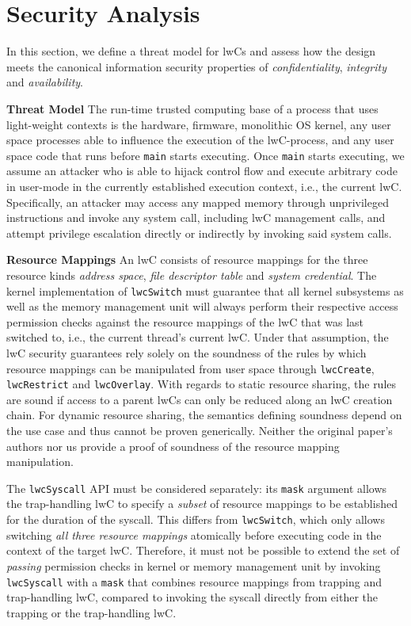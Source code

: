 \documentclass[10pt,twocolumn,a4paper]{article}
\begin{document}
\section{Security Analysis}\label{security}

In this section, we define a threat model for lwCs and assess how the design meets the canonical information security properties of \textit{confidentiality}, \textit{integrity} and \textit{availability}\cite{ciagoals}.

\textbf{Threat Model}\hspace{1em}
The run-time trusted computing base of a process that uses light-weight contexts is the
hardware,
firmware,
monolithic OS kernel,
any user space processes able to influence the execution of the lwC-process,
and any user space code that runs before \lstinline{main} starts executing.
Once \lstinline{main} starts executing, we assume an attacker who is able to hijack control flow and execute arbitrary code in user-mode in the currently established execution context, i.e., the current lwC.
Specifically, an attacker may access any mapped memory through unprivileged instructions and invoke any system call, including lwC management calls, and attempt privilege escalation directly or indirectly by invoking said system calls.
\cite{lwcpaper}

\textbf{Resource Mappings}\hspace{1em}
An lwC consists of resource mappings for the three resource kinds \textit{address space}, \textit{file descriptor table} and \textit{system credential}.
The kernel implementation of \texttt{lwcSwitch} must guarantee that all kernel subsystems as well as the memory management unit will always perform their respective access permission checks against the resource mappings of the lwC that was last switched to, i.e., the current thread's current lwC.
Under that assumption, the lwC security guarantees rely solely on the soundness of the rules by which resource mappings can be manipulated from user space through \lstinline{lwcCreate}, \lstinline{lwcRestrict} and \lstinline{lwcOverlay}.
With regards to static resource sharing, the rules are sound if access to a parent lwCs can only be reduced along an lwC creation chain.
For dynamic resource sharing, the semantics defining soundness depend on the use case and thus cannot be proven generically.
Neither the original paper's authors nor us provide a proof of soundness of the resource mapping manipulation.

The \lstinline{lwcSyscall} API must be considered separately:
its \lstinline{mask} argument allows the trap-handling lwC to specify a \textit{subset} of resource mappings to be established for the duration of the syscall.
This differs from \lstinline{lwcSwitch}, which only allows switching \textit{all three resource mappings} atomically before executing code in the context of the target lwC.
Therefore, it must not be possible to extend the set of \textit{passing} permission checks in kernel or memory management unit by invoking \lstinline{lwcSyscall} with a \lstinline{mask} that combines resource mappings from trapping and trap-handling lwC, compared to invoking the syscall directly from either the trapping or the trap-handling lwC.
\end{document}
